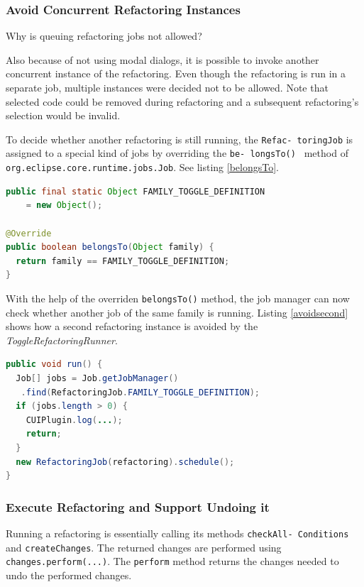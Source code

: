 \subsubsection{Avoid Concurrent Refactoring Instances}
Why is queuing refactoring jobs not allowed?

Also because of not using modal dialogs, it is possible to invoke another 
concurrent instance of the refactoring. Even though the refactoring is run 
in a separate job, multiple instances were decided not to be allowed. Note 
that selected code could be removed during refactoring and a subsequent 
refactoring's selection would be invalid.

To decide whether another refactoring is still running, the \texttt{Refac- 
toringJob} is assigned to a special kind of jobs by overriding the \texttt{be- 
longsTo() } method of \texttt{org.eclipse.core.runtime.jobs.Job}. See listing 
\ref{belongsTo}.

\begin{lstlisting}[caption={RefactoringJob is assigned to a separate family of 
jobs},label={belongsTo},language=java]
public final static Object FAMILY_TOGGLE_DEFINITION
    = new Object();

@Override
public boolean belongsTo(Object family) {
  return family == FAMILY_TOGGLE_DEFINITION;
}
\end{lstlisting}

With the help of the overriden \texttt{belongsTo()} method, the job manager can 
now check whether another job of the same family is running. Listing 
\ref{avoidsecond} shows how a second refactoring instance is avoided by the 
\textit{ToggleRefactoringRunner}.

\begin{lstlisting}[caption={ToggleRefactoringRunner avoiding a 2$^{nd}$ refactoring instance},
label={avoidsecond}, language=Java]
public void run() {
  Job[] jobs = Job.getJobManager()
   .find(RefactoringJob.FAMILY_TOGGLE_DEFINITION);
  if (jobs.length > 0) {
    CUIPlugin.log(...);
    return;
  }
  new RefactoringJob(refactoring).schedule();
}
\end{lstlisting}


\subsubsection{Execute Refactoring and Support Undoing it}
Running a refactoring is essentially calling its methods 
\texttt{checkAll- Conditions} and \texttt{createChanges}. The returned 
changes are performed using \texttt{changes.perform(...)}. The 
\texttt{perform} method returns the changes needed to undo the performed 
changes.

